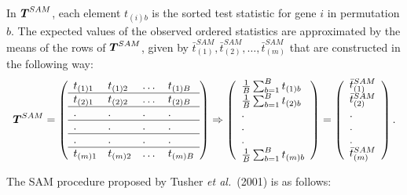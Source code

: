 \documentclass[10pt]{mybook4}
\newcommand{\T}{\mbox{\boldmath $T$}}
\begin{document}
In $\T^{SAM}$, each element $t_{(i)b}$ is the sorted test statistic
for gene $i$ in permutation $b$. The expected values of the observed
ordered statistics are approximated by the means of the rows of
$\T^{SAM}$, given by $\bar{t}_{(1)}^{SAM}, \bar{t}_{(2)}^{SAM},
\dots, \bar{t}_{(m)}^{SAM}$ that are constructed in the following
way:
\[
\T^{SAM}= \left (
\begin{array}{llll}
t_{(1)1} & t_{(1)2} & \dots & t_{(1)B}\\ \hline t_{(2)1}
& t_{(2)2} & \dots & t_{(2)B}\\ \hline .    & . &.      & .
\\ \hline .    & .    &.      & .     \\ \hline . & .    &.      & .
\\ \hline
t_{(m)1} & t_{(m)2} & \dots & t_{(m)B}\\
\end{array}
\right ) \Rightarrow \left (
\begin{array}{l}
\frac{1}{B}\sum_{b=1}^{B}t_{(1)b} \\
\frac{1}{B}\sum_{b=1}^{B}t_{(2)b} \\
.                                     \\
.                                     \\
.                                     \\
\frac{1}{B}\sum_{b=1}^{B}t_{(m)b} \\
\end{array}
\right ) = \left (
\begin{array}{l}
\bar{t}_{(1)}^{SAM} \\
\bar{t}_{(2)}^{SAM} \\
.                                     \\
.                                     \\
.                                     \\
\bar{t}_{(m)}^{SAM} \\
\end{array}
\right ).
\]


The SAM procedure proposed by Tusher \textit{et al.}\ (2001) is as
follows:
\end{document}
